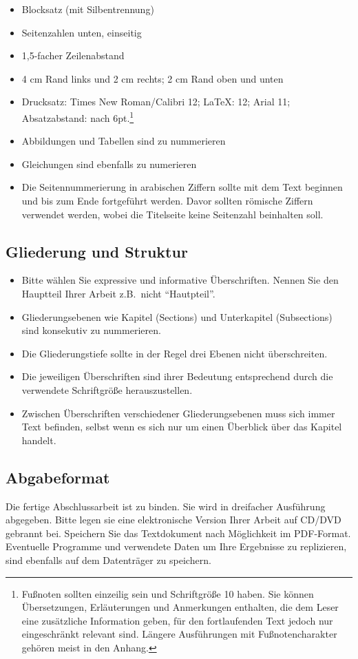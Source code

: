\documentclass[a4paper,12pt]{scrartcl} %
\begin{document}
\begin{itemize}
\item Blocksatz (mit Silbentrennung)
\item Seitenzahlen unten, einseitig
\item 1,5-facher Zeilenabstand
\item 4 cm Rand links und 2 cm rechts; 2 cm Rand oben und unten
\item Drucksatz: Times New Roman/Calibri 12; \LaTeX: 12; Arial 11; Absatzabstand:
nach 6pt.\footnote{Fußnoten sollten einzeilig sein und Schriftgröße 10 haben. Sie können Übersetzungen, Erläuterungen und Anmerkungen enthalten, die dem Leser eine zusätzliche Information geben, für den fortlaufenden Text jedoch nur eingeschränkt relevant sind. Längere Ausführungen mit Fußnotencharakter gehören meist in den Anhang.}
\item Abbildungen und Tabellen sind zu nummerieren
\item Gleichungen sind ebenfalls zu numerieren
\item Die Seitennummerierung in arabischen Ziffern sollte mit dem Text beginnen und bis zum Ende fortgeführt werden. Davor sollten römische Ziffern verwendet werden, wobei die Titelseite keine Seitenzahl beinhalten soll.
\end{itemize}

\subsection{Gliederung und Struktur}

\begin{itemize}
   \item Bitte wählen Sie expressive und informative Überschriften. Nennen Sie den Hauptteil Ihrer Arbeit z.B.\ nicht ``Hautpteil''.
   \item Gliederungsebenen wie Kapitel (Sections) und Unterkapitel (Subsections) sind konsekutiv zu nummerieren.
   \item Die Gliederungstiefe sollte in der Regel drei Ebenen nicht überschreiten.
   \item Die jeweiligen Überschriften sind ihrer Bedeutung entsprechend durch die verwendete Schriftgröße herauszustellen.
   \item Zwischen Überschriften verschiedener Gliederungsebenen muss sich immer Text befinden, selbst wenn es sich nur um einen Überblick über das Kapitel handelt.
 \end{itemize}


\subsection{Abgabeformat}
Die fertige Abschlussarbeit ist zu binden. Sie wird in dreifacher Ausführung abgegeben. Bitte legen sie
eine elektronische Version Ihrer Arbeit auf CD/DVD gebrannt bei. Speichern Sie das Textdokument nach Möglichkeit im PDF-Format. Eventuelle Programme und verwendete Daten um Ihre Ergebnisse zu replizieren, sind ebenfalls auf dem Datenträger zu speichern.
\end{document}
